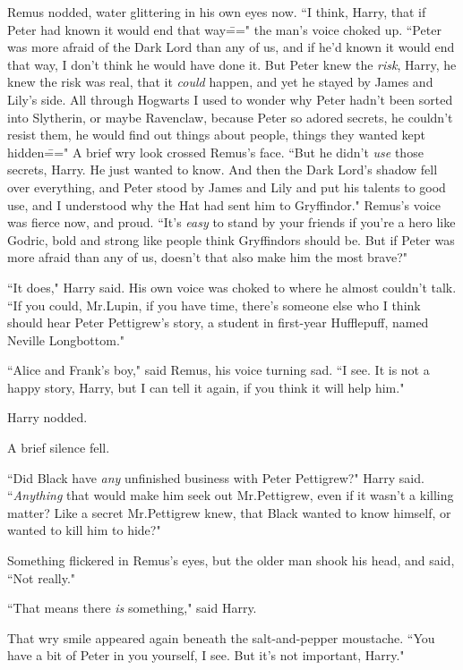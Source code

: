 Remus nodded, water glittering in his own eyes now. ``I think, Harry, that if Peter had known it would end that way\===" the man's voice choked up. ``Peter was more afraid of the Dark Lord than any of us, and if he'd known it would end that way, I don't think he would have done it. But Peter knew the \emph{risk}, Harry, he knew the risk was real, that it \emph{could} happen, and yet he stayed by James and Lily's side. All through Hogwarts I used to wonder why Peter hadn't been sorted into Slytherin, or maybe Ravenclaw, because Peter so adored secrets, he couldn't resist them, he would find out things about people, things they wanted kept hidden\===" A brief wry look crossed Remus's face. ``But he didn't \emph{use} those secrets, Harry. He just wanted to know. And then the Dark Lord's shadow fell over everything, and Peter stood by James and Lily and put his talents to good use, and I understood why the Hat had sent him to Gryffindor." Remus's voice was fierce now, and proud. ``It's \emph{easy} to stand by your friends if you're a hero like Godric, bold and strong like people think Gryffindors should be. But if Peter was more afraid than any of us, doesn't that also make him the most brave?"

``It does," Harry said. His own voice was choked to where he almost couldn't talk. ``If you could, Mr.\?Lupin, if you have time, there's someone else who I think should hear Peter Pettigrew's story, a student in first-year Hufflepuff, named Neville Longbottom."

``Alice and Frank's boy," said Remus, his voice turning sad. ``I see. It is not a happy story, Harry, but I can tell it again, if you think it will help him."

Harry nodded.

A brief silence fell.

``Did Black have \emph{any} unfinished business with Peter Pettigrew?" Harry said. ``\emph{Anything} that would make him seek out Mr.\?Pettigrew, even if it wasn't a killing matter? Like a secret Mr.\?Pettigrew knew, that Black wanted to know himself, or wanted to kill him to hide?"

Something flickered in Remus's eyes, but the older man shook his head, and said, ``Not really."

``That means there \emph{is} something," said Harry.

That wry smile appeared again beneath the salt-and-pepper moustache. ``You have a bit of Peter in you yourself, I see. But it's not important, Harry."

